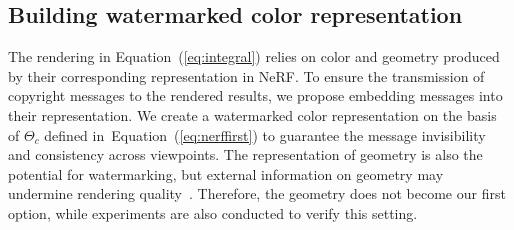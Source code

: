 \documentclass[10pt,twocolumn,letterpaper]{article}
\newcommand{\Eref}[1]{Equation~(\ref{#1})}
\begin{document}



\subsection{Building watermarked color representation}
\label{sec:4.1}
The rendering in \Eref{eq:integral} relies on color and geometry produced by their corresponding representation in NeRF. To ensure the transmission of copyright messages to the rendered results, we propose embedding messages into their representation. We create a watermarked color representation on the basis of $\Theta_c$ defined in~\Eref{eq:nerffirst} to guarantee the message invisibility and consistency across viewpoints. The representation of geometry is also the potential for watermarking, but external information on geometry may undermine rendering quality~\cite{wang2022nerf, Huang22StylizedNeRF, chiang2022stylizing}. Therefore, the geometry does not become our first option, while experiments are also conducted to verify this setting.
\end{document}
